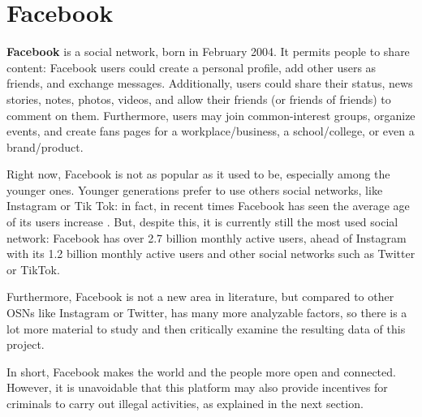 \section{Facebook}
\textbf{Facebook}\parencite{site:facebook} is a social network, born in February 2004. 
It permits people to share content: Facebook users could create a personal profile, add other users as friends, and exchange messages. Additionally, users could share their status, news stories, notes, photos, videos, and allow their friends (or friends of friends) to comment on them. Furthermore, users may join common-interest groups, organize events, and create fans pages for a workplace/business, a school/college, or even a brand/product. \par \noindent
Right now, Facebook is not as popular as it used to be, especially among the younger ones. Younger generations prefer to use others social networks, like Instagram or Tik Tok: in fact, in recent times Facebook has seen the average age of its users increase \parencite{site:gen-z}. But, despite this, it is currently still the most used social network: Facebook has over 2.7 billion monthly active users, ahead of Instagram with its 1.2 billion monthly active users and other social networks such as Twitter or TikTok. \parencite{site:top-social}
\par \noindent Furthermore, Facebook is not a new area in literature, but compared to other OSNs like Instagram or Twitter, has many more analyzable factors, so there is a lot more material to study and then critically examine the resulting data of this project.\par 	\noindent
In short, Facebook makes the world and the people more open and connected.
However, it is unavoidable that this platform may also provide incentives for criminals to carry out illegal activities, as explained in the next section.

